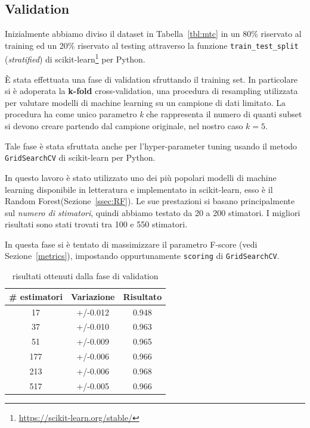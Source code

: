 \subsection{Validation}
\label{ssec:validation_Topic}
Inizialmente abbiamo diviso il dataset in Tabella~\ref{tbl:mtc} in un 80\% riservato al training ed un 20\% riservato al testing attraverso la funzione {\tt train\_test\_split} (\textit{stratified}) di scikit-learn\footnote{\url{https://scikit-learn.org/stable/}} per Python.

È stata effettuata una fase di validation sfruttando il training set. In particolare si è adoperata la \textbf{k-fold} cross-validation, una procedura di resampling utilizzata per valutare modelli di machine learning su un campione di dati limitato. La procedura ha come unico parametro \textit{k} che rappresenta il numero di quanti subset si devono creare partendo dal campione originale, nel nostro caso $ k = 5 $.

Tale fase è stata sfruttata anche per l'hyper-parameter tuning usando il metodo {\tt GridSearchCV} di scikit-learn per Python.

In questo lavoro è stato utilizzato uno dei più popolari modelli di machine learning disponibile in letteratura e implementato in scikit-learn, esso è il Random Forest(Sezione~\ref{ssec:RF}). Le sue prestazioni si basano principalmente sul \textit{numero di stimatori}, quindi abbiamo testato da 20 a 200 stimatori. I migliori risultati sono stati trovati tra 100 e 550 stimatori.

In questa fase si è tentato di massimizzare il parametro F-score (vedi Sezione~\ref{metrics}), impostando oppurtunamente {\tt scoring} di {\tt GridSearchCV}.

\begin{table}[h]
\centering
\begin{tabular}{|c|c|c|}
\hline
\textbf{\# estimatori} & \textbf{Variazione} & \textbf{Risultato} \\ \hline
17 & +/-0.012 & 0.948 \\ \hline
37 & +/-0.010 & 0.963 \\ \hline
51 & +/-0.009 & 0.965 \\ \hline
177 & +/-0.006 & 0.966 \\ \hline
213 & +/-0.006 & 0.968 \\ \hline
517 & +/-0.005 & 0.966 \\ \hline
\end{tabular}
\caption{risultati ottenuti dalla fase di validation}
\label{tab:validationresult}
\end{table}
\FloatBarrier

